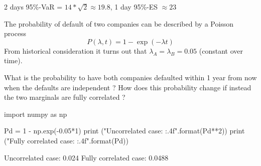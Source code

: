 \documentclass[12pt,a4paper]{exam}
\begin{document}
\begin{questions}
\begin{solution}
2 days 95\%-VaR = $14 * \sqrt{2} \approx 19.8$, 1 day 95\%-ES $\approx 23$
\end{solution}

\question The probability of default of two companies can be described by a Poisson process 
\begin{equation*}
P(\lambda, t) = 1 - \exp(-\lambda t)
\end{equation*}
From historical consideration it turns out that $\lambda_A = \lambda_B = 0.05$ (constant over time). 

What is the probability to have both companies defaulted within 1 year from now when the defaults are independent ?
How does this probability change if instead the two marginals are fully correlated ?

\makeemptybox{1.5 cm}

\begin{solution}
\begin{ipython}
import numpy as np

Pd = 1 - np.exp(-0.05*1)
print ("Uncorrelated case: {:.4f}".format(Pd**2))
print ("Fully correlated case: {:.4f}".format(Pd))
\end{ipython}
\begin{ioutput}
Uncorrelated case: 0.024
Fully correlated case: 0.0488
\end{ioutput}
\end{solution}

\end{questions}
\end{document}
